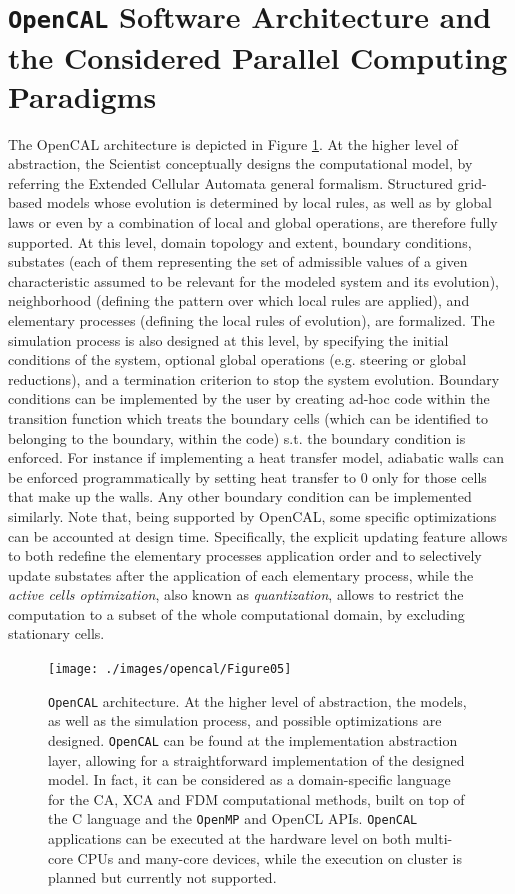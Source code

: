 \section[Software Architecture]{\texttt{OpenCAL} Software Architecture and the Considered Parallel Computing Paradigms}

The OpenCAL architecture is depicted in Figure
\ref{fig:architecture}. At the higher level of abstraction, the
Scientist conceptually designs the computational model, by referring
the Extended Cellular Automata general formalism. Structured
grid-based models whose evolution is determined by local rules, as
well as by global laws or even by a combination of local and global
operations, are therefore fully supported. At this level, domain
topology and extent, boundary conditions, substates (each of them
representing the set of admissible values of a given characteristic
assumed to be relevant for the modeled system and its evolution),
neighborhood (defining the pattern over which local rules are
applied), and elementary processes (defining the local rules of
evolution), are formalized. The simulation process is also designed
at this level, by specifying the initial conditions of the system,
optional global operations (e.g. steering or global reductions), and
a termination criterion to stop the system evolution. 
Boundary conditions can be implemented by the user by creating ad-hoc code within the transition function which treats the boundary cells (which can be identified to belonging to the boundary, within the code) s.t. the boundary condition is enforced.
For instance if implementing a heat transfer model, adiabatic walls can be enforced programmatically by setting heat transfer to $0$ only for those cells that make up the walls. Any other boundary condition can be implemented similarly.
Note that, being supported by OpenCAL, some specific optimizations can be
accounted at design time. Specifically, the explicit updating
feature allows to both redefine the elementary processes application
order and to selectively update substates after the application of
each elementary process, while the \emph{active cells optimization},
also known as \emph{quantization}, allows to restrict the
computation to a subset of the whole computational domain, by
excluding stationary cells.
\begin{figure}
	\begin{center}
\texttt{[image: ./images/opencal/Figure05]}
\caption[\texttt{OpenCAL} architecture.]{\texttt{OpenCAL} architecture. At the higher level of abstraction, the models,
	as well as the simulation process, and possible optimizations are
	designed. \texttt{OpenCAL} can be found at the implementation abstraction
	layer, allowing for a straightforward implementation of the designed
	model. In fact, it can be considered as a domain-specific language for
	the CA, XCA and FDM computational methods, built on top of the C
	language and the \texttt{OpenMP} and OpenCL APIs. \texttt{OpenCAL} applications can be
	executed at the hardware level on both multi-core CPUs and many-core
	devices, while the execution on cluster is planned but currently not
	supported.}
\label{fig:architecture}
\end{center}
\end{figure}

